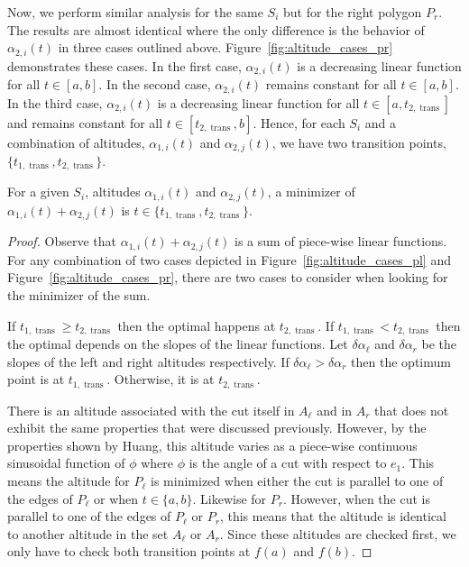 \documentclass[../main.tex]{subfiles}
\begin{document}
Now, we perform similar analysis for the same $S_i$ but for the right polygon $P_r$. The results are almost identical where the only difference is the behavior of $\alpha_{2,i}(t)$ in three cases outlined above. Figure~\ref{fig:altitude_cases_pr} demonstrates these cases. In the first case, $\alpha_{2,i}(t)$ is a decreasing linear function for all $t\in[a,b]$. In the second case, $\alpha_{2,i}(t)$ remains constant for all $t\in[a,b]$. In the third case, $\alpha_{2,i}(t)$ is a decreasing linear function for all $t\in[a,t_{2,\operatorname{trans}}]$ and remains constant for all $t\in[t_{2,\operatorname{trans}},b]$. Hence, for each $S_i$ and a combination of altitudes, $\alpha_{1,i}(t)$ and $\alpha_{2,j}(t)$, we have two transition points, $\{t_{1,\operatorname{trans}}, t_{2,\operatorname{trans}}\}$.
\begin{lemma}
\label{lemma:min_at_trans_pts}
For a given $S_i$, altitudes $\alpha_{1,i}(t)$ and $\alpha_{2,j}(t)$, a minimizer of $\alpha_{1,i}(t)+\alpha_{2,j}(t)$ is $t\in\{t_{1,\operatorname{trans}}, t_{2,\operatorname{trans}}\}$.
\end{lemma}
\begin{proof}
Observe that $\alpha_{1,i}(t)+\alpha_{2,j}(t)$ is a sum of piece-wise linear functions.  For any combination of two cases depicted in Figure~\ref{fig:altitude_cases_pl} and Figure~\ref{fig:altitude_cases_pr}, there are two cases to consider when looking for the minimizer of the sum.

If $t_{1,\operatorname{trans}}\geq t_{2,\operatorname{trans}}$ then the optimal happens at $t_{2,\operatorname{trans}}$. If $t_{1,\operatorname{trans}}<t_{2,\operatorname{trans}}$ then the optimal depends on the slopes of the linear functions. Let $\delta\alpha_{\ell}$ and $\delta\alpha_r$ be the slopes of the left and right altitudes respectively. If $\delta\alpha_{\ell}>\delta\alpha_r$ then the optimum point is at $t_{1,\operatorname{trans}}$. Otherwise, it is at $t_{2,\operatorname{trans}}$.

There is an altitude associated with the cut itself in $A_{\ell}$ and in $A_r$ that does not exhibit the same properties that were discussed previously. However, by the properties shown by Huang\cite{Huang2001optimal}, this altitude varies as a piece-wise continuous sinusoidal function of $\phi$ where $\phi$ is the angle of a cut with respect to $e_1$. This means the altitude for $P_{\ell}$ is minimized when either the cut is parallel to one of the edges of $P_{\ell}$ or when $t\in\{a,b\}$. Likewise for $P_r$. However, when the cut is parallel to one of the edges of $P_{\ell}$ or $P_r$, this means that the altitude is identical to another altitude in the set $A_{\ell}$ or $A_r$. Since these altitudes are checked first, we only have to check both transition points at $f(a)$ and $f(b)$.
\end{proof}
\end{document}
